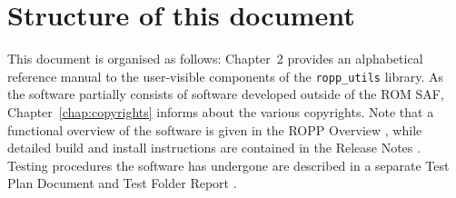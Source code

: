 

\section{Structure of this document}

This document is organised as follows: Chapter~2 provides an
alphabetical reference manual to the user-visible components of the
\texttt{ropp\_utils} library. As the software partially consists of
software developed outside of the ROM SAF,
Chapter~\ref{chap:copyrights} informs about the various copyrights.
Note that a functional overview of the software is given in the ROPP
Overview \citep{romsaf_ov}, while detailed build and install instructions 
are contained in the Release Notes \citep{romsaf_srn}. Testing
procedures the software has undergone are described in a separate Test
Plan Document \citep{romsaf_testplan} and Test Folder Report 
\citep{romsaf_testrep}.






